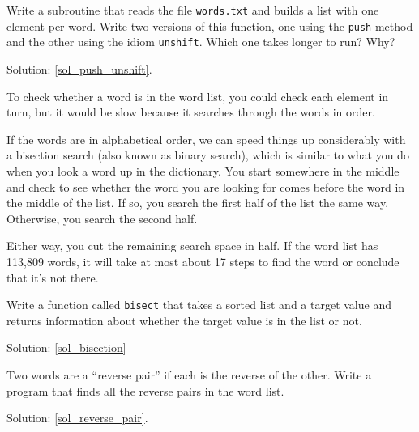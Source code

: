 \begin{exercise}

\label{push_unshift}
Write a subroutine that reads the file {\tt words.txt} and builds
a list with one element per word.  Write two versions of
this function, one using the {\tt push} method and the
other using the idiom {\tt unshift}.  Which one takes
longer to run?  Why?

Solution: \ref{sol_push_unshift}.


\end{exercise}


\begin{exercise}
\label{bisection}

To check whether a word is in the word list, you could check each element in turn, but it would be slow because it searches through the words in order.

If the words are in alphabetical order, we can speed 
things up considerably with a bisection search (also 
known as binary search), which is similar to what you 
do when you look a word up in the dictionary.  You
start somewhere in the middle and check to see whether 
the word you are looking for comes before the word in 
the middle of the list.  If so, you search the first 
half of the list the same way.  Otherwise, you search
the second half.

Either way, you cut the remaining search space in half. 
If the word list has 113,809 words, it will take at 
most about 17 steps to find the word or conclude that 
it's not there.

Write a function called \verb"bisect" that takes a 
sorted list and a target value and returns information 
about whether the target value is in the list or not.

Solution: \ref{sol_bisection}

\end{exercise}

\begin{exercise}
\label{reverse_pair}

Two words are a ``reverse pair'' if each is the reverse of the
other.  Write a program that finds all the reverse pairs in the
word list.

Solution: \ref{sol_reverse_pair}.

\end{exercise}

